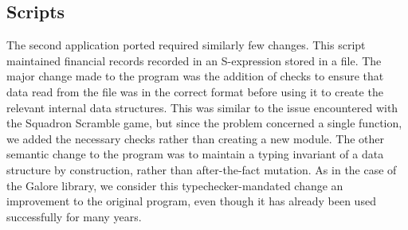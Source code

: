 \begin{schemeregion}
\section{Scripts}
The second application ported required similarly few changes.  This
script maintained financial records recorded in an S-expression
stored in a file.  The major change made to the program was the
addition of checks to ensure that data read from the file was in the
correct format before using it to create the relevant internal
data structures.  This was similar to the issue encountered with the
Squadron Scramble game, but since the problem concerned a single
function, we added the necessary checks rather than creating a new
module.  The other semantic change to the program was to maintain a
typing invariant of a data structure by construction, rather
than after-the-fact mutation.  As in the case of the Galore library,
we consider this typechecker-mandated change an improvement to
the original program, even though it has already been used successfully
for many years.
\end{schemeregion}
